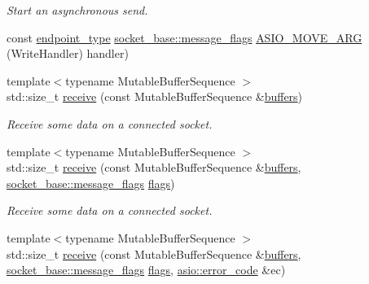 \begin{DoxyCompactItemize}
\begin{DoxyCompactList}\small\item\em Start an asynchronous send. \end{DoxyCompactList}\item 
const \hyperlink{classasio_1_1basic__datagram__socket_af952c8d18c85588a16531cfc54a172bb}{endpoint\+\_\+type} \hyperlink{classasio_1_1socket__base_ac3cf77465dfedfe1979b5415cf32cc94}{socket\+\_\+base\+::message\+\_\+flags} \hyperlink{classasio_1_1basic__datagram__socket_a86e2f561287a59ca67bd80243b2392a8}{A\+S\+I\+O\+\_\+\+M\+O\+V\+E\+\_\+\+A\+R\+G} (Write\+Handler) handler)
\item 
{\footnotesize template$<$typename Mutable\+Buffer\+Sequence $>$ }\\std\+::size\+\_\+t \hyperlink{classasio_1_1basic__datagram__socket_a3f37ceb0525d984ea774a3bf21050af2}{receive} (const Mutable\+Buffer\+Sequence \&\hyperlink{group__async__read_ga54dede45c3175148a77fe6635222c47d}{buffers})
\begin{DoxyCompactList}\small\item\em Receive some data on a connected socket. \end{DoxyCompactList}\item 
{\footnotesize template$<$typename Mutable\+Buffer\+Sequence $>$ }\\std\+::size\+\_\+t \hyperlink{classasio_1_1basic__datagram__socket_a81e8691c9427005419fb0bde116566eb}{receive} (const Mutable\+Buffer\+Sequence \&\hyperlink{group__async__read_ga54dede45c3175148a77fe6635222c47d}{buffers}, \hyperlink{classasio_1_1socket__base_ac3cf77465dfedfe1979b5415cf32cc94}{socket\+\_\+base\+::message\+\_\+flags} \hyperlink{classasio_1_1basic__datagram__socket_a787b917059f9c50a483196d3edaf800c}{flags})
\begin{DoxyCompactList}\small\item\em Receive some data on a connected socket. \end{DoxyCompactList}\item 
{\footnotesize template$<$typename Mutable\+Buffer\+Sequence $>$ }\\std\+::size\+\_\+t \hyperlink{classasio_1_1basic__datagram__socket_a58df2ac7400cbfc26d091d8cc5a83cdd}{receive} (const Mutable\+Buffer\+Sequence \&\hyperlink{group__async__read_ga54dede45c3175148a77fe6635222c47d}{buffers}, \hyperlink{classasio_1_1socket__base_ac3cf77465dfedfe1979b5415cf32cc94}{socket\+\_\+base\+::message\+\_\+flags} \hyperlink{classasio_1_1basic__datagram__socket_a787b917059f9c50a483196d3edaf800c}{flags}, \hyperlink{classasio_1_1error__code}{asio\+::error\+\_\+code} \&ec)

\end{DoxyCompactItemize}
